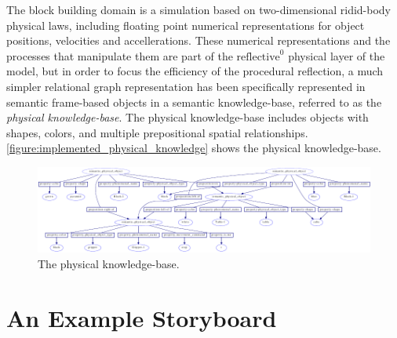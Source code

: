 The block building domain is a simulation based on two-dimensional
ridid-body physical laws, including floating point numerical
representations for object positions, velocities and accellerations.
These numerical representations and the processes that manipulate them
are part of the $\text{reflective}^0$ physical layer of the model, but
in order to focus the efficiency of the procedural reflection, a much
simpler relational graph representation has been specifically
represented in semantic frame-based objects in a semantic
knowledge-base, referred to as the \emph{physical knowledge-base}.
The physical knowledge-base includes objects with shapes, colors, and
multiple prepositional spatial relationships.
{\mbox{\autoref{figure:implemented_physical_knowledge}}} shows the
physical knowledge-base.
\begin{figure}
\begin{center}
\includegraphics[width=24cm]{gfx/implemented_physical_knowledge}
\end{center}
\hspace{4cm}\parbox{15cm}{\caption[The physical knowledge-base.]{The
    physical
    knowledge-base.}\label{figure:implemented_physical_knowledge}}
\end{figure}

\section{An Example Storyboard}

